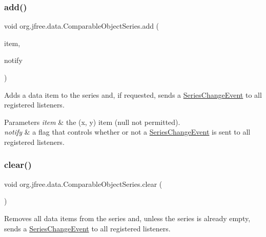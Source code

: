 \subsubsection{\texorpdfstring{add()}{add()}\hspace{0.1cm}{\footnotesize\ttfamily [3/3]}}
{\footnotesize\ttfamily void org.\+jfree.\+data.\+Comparable\+Object\+Series.\+add (\begin{DoxyParamCaption}\item[{\mbox{\hyperlink{classorg_1_1jfree_1_1data_1_1_comparable_object_item}{Comparable\+Object\+Item}}}]{item,  }\item[{boolean}]{notify }\end{DoxyParamCaption})\hspace{0.3cm}{\ttfamily [protected]}}

Adds a data item to the series and, if requested, sends a \mbox{\hyperlink{}{Series\+Change\+Event}} to all registered listeners.


\begin{DoxyParams}{Parameters}
{\em item} & the (x, y) item ({\ttfamily null} not permitted). \\
\hline
{\em notify} & a flag that controls whether or not a \mbox{\hyperlink{}{Series\+Change\+Event}} is sent to all registered listeners. \\
\hline
\end{DoxyParams}
\mbox{\label{classorg_1_1jfree_1_1data_1_1_comparable_object_series_a181cb80e8a94e64a9ebc3636b37f3fde}} 
\subsubsection{\texorpdfstring{clear()}{clear()}}
{\footnotesize\ttfamily void org.\+jfree.\+data.\+Comparable\+Object\+Series.\+clear (\begin{DoxyParamCaption}{ }\end{DoxyParamCaption})}

Removes all data items from the series and, unless the series is already empty, sends a \mbox{\hyperlink{}{Series\+Change\+Event}} to all registered listeners. \mbox{\label{classorg_1_1jfree_1_1data_1_1_comparable_object_series_ae5866252b9fedcee196a1572832f8d78}} 
